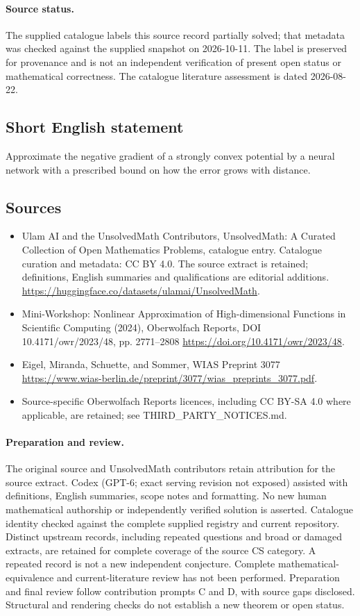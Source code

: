 \documentclass[11pt]{article}
\begin{document}
\paragraph{Source status.}
The supplied catalogue labels this source record partially solved; that metadata was checked against the supplied snapshot on 2026-10-11. The label is preserved for provenance and is not an independent verification of present open status or mathematical correctness. The catalogue literature assessment is dated 2026-08-22.
\subsection{Short English statement}
Approximate the negative gradient of a strongly convex potential by a neural network with a prescribed bound on how the error grows with distance.
\subsection{Sources}
\begin{itemize}
\item[\hypertarget{source:statement:1}{S1}] Ulam AI and the UnsolvedMath Contributors, UnsolvedMath: A Curated Collection of Open Mathematics Problems, catalogue entry. Catalogue curation and metadata: CC BY 4.0. The source extract is retained; definitions, English summaries and qualifications are editorial additions.
\url{https://huggingface.co/datasets/ulamai/UnsolvedMath}.
\item[\hypertarget{source:statement:2}{S2}] Mini-Workshop: Nonlinear Approximation of High-dimensional Functions in Scientific Computing (2024), Oberwolfach Reports, DOI 10.4171/owr/2023/48, pp. 2771--2808
\url{https://doi.org/10.4171/owr/2023/48}.
\item[\hypertarget{source:statement:3}{S3}] Eigel, Miranda, Schuette, and Sommer, WIAS Preprint 3077
\url{https://www.wias-berlin.de/preprint/3077/wias_preprints_3077.pdf}.
\item Source-specific Oberwolfach Reports licences, including CC BY-SA 4.0 where applicable, are retained; see THIRD\_PARTY\_NOTICES.md.
\end{itemize}
\paragraph{Preparation and review.}
The original source and UnsolvedMath contributors retain attribution for the source extract. Codex (GPT-6; exact serving revision not exposed) assisted with definitions, English summaries, scope notes and formatting. No new human mathematical authorship or independently verified solution is asserted. Catalogue identity checked against the complete supplied registry and current repository. Distinct upstream records, including repeated questions and broad or damaged extracts, are retained for complete coverage of the source CS category. A repeated record is not a new independent conjecture. Complete mathematical-equivalence and current-literature review has not been performed. Preparation and final review follow contribution prompts C and D, with source gaps disclosed. Structural and rendering checks do not establish a new theorem or open status.
\label{end:statement}
\end{document}
